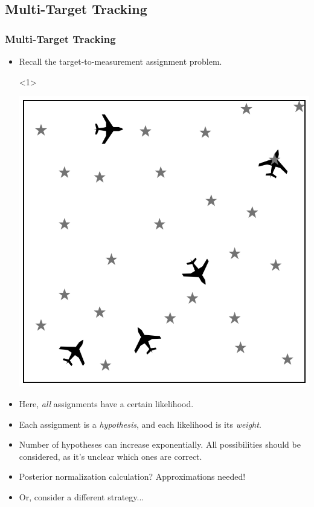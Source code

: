 \subsection*{Multi-Target Tracking}\begin{frame}\frametitle{Multi-Target Tracking}
    \begin{itemize}
        \item Recall the target-to-measurement assignment problem.
        \begin{onlyenv}<1>
        \begin{center}
            \vspace{1em}
            \includegraphics[width=0.4\linewidth]{pic/assignment-problem-gray.png}
        \end{center}
        \end{onlyenv}
        \pause
        \item Here, \textit{all} assignments have a certain likelihood.
        \pause
        \item Each assignment is a \textit{hypothesis}, and each likelihood is its \textit{weight}.
        \pause
        \item Number of hypotheses can increase exponentially. All possibilities should be considered, as it's unclear which ones are correct.
        \pause
        \item Posterior normalization calculation? \pause \alert{Approximations needed!}
        \pause
        \item Or, consider a different strategy...
    \end{itemize}
\end{frame}
